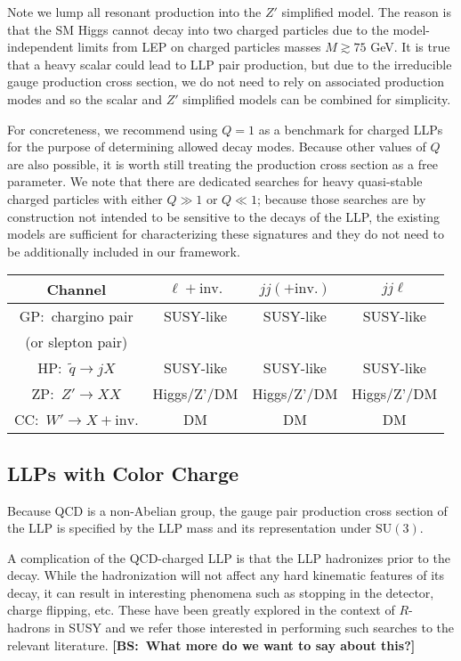 Note we lump all resonant production into the $Z'$ simplified model. The reason is that the SM Higgs cannot decay into two charged particles due to the model-independent limits from LEP on charged particles masses $M\gtrsim75$ GeV. It is true that a heavy scalar could lead to LLP pair production, but due to the irreducible gauge production cross section, we do not need to rely on associated production modes and so the scalar and $Z'$ simplified models can be combined for simplicity.

For concreteness, we recommend using $Q=1$ as a benchmark for charged LLPs for the purpose of determining allowed decay modes. Because other values of $Q$ are also possible, it is worth still treating the production cross section as a free parameter. We note that there are dedicated searches for heavy quasi-stable charged particles with either $Q\gg1$ or $Q\ll1$; because those searches are by construction not intended to be sensitive to the decays of the LLP, the existing models are sufficient for characterizing these signatures and they do not need to be additionally included in our framework.

\begin{center}
\begin{tabular}{ |c|c|c|c|} 
 \hline
Channel & $\ell+\mathrm{inv.}$ &  $jj(+\mathrm{inv.})$ & $jj\ell$ \\
\hline\hline
GP:~chargino pair & SUSY-like & SUSY-like & SUSY-like \\
(or slepton pair) & & &\\
\hline
HP:~$\tilde{q}\rightarrow j X$ & SUSY-like & SUSY-like & SUSY-like \\
\hline
ZP:~$Z'\rightarrow XX$ & Higgs/Z'/DM & Higgs/Z'/DM & Higgs/Z'/DM \\
\hline
CC:~$W'\rightarrow X+\mathrm{inv.}$ & DM & DM & DM\\
\hline
\end{tabular}
\end{center}

\subsection{LLPs with Color Charge}

Because QCD is a non-Abelian group, the gauge pair production cross section of the LLP is specified by the LLP mass and its representation under $\mathrm{SU}(3)$. 

A complication of the QCD-charged LLP is that the LLP hadronizes prior to the decay. While the hadronization will not affect any hard kinematic features of its decay, it can result in interesting phenomena such as stopping in the detector, charge flipping, etc. These have been greatly explored in the context of $R$-hadrons in SUSY and we refer those interested in performing such searches to the relevant literature. {\bf [BS:~What more do we want to say about this?]}

